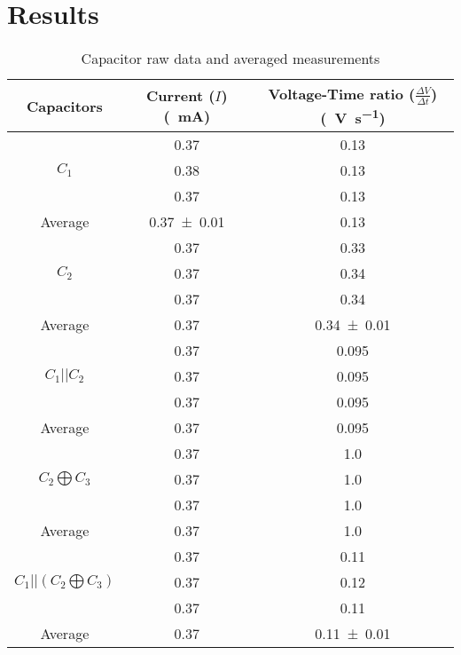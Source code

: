 \documentclass[a4paper]{scrartcl}
\begin{document}
\section{Results}
\begin{table}
    \centering
    \begin{tabular}{c | c | c}
        Capacitors & Current (\(I\)) (\SI{}{\milli\ampere}) & Voltage-Time ratio (\(\frac{\Delta V}{\Delta t}\)) (\SI{}{\volt\per\second}) \\
        \hline

        & \SI{0.37}{} & \SI{0.13}{} \\
        \(C_1\) & \SI{0.38}{} & \SI{0.13}{} \\
        & \SI{0.37}{} & \SI{0.13}{} \\
        \hdashline
        Average & \SI{0.37 \pm 0.01}{} & \SI{0.13}{} \\
        \hline

        & \SI{0.37}{} & \SI{0.33}{} \\
        \(C_2\) & \SI{0.37}{} & \SI{0.34}{} \\
        & \SI{0.37}{} & \SI{0.34}{} \\
        \hdashline
        Average & \SI{0.37}{} & \SI{0.34 \pm 0.01}{} \\
        \hline

        & \SI{0.37}{} & \SI{0.095}{} \\
        \(C_1 || C_2\) & \SI{0.37}{} & \SI{0.095}{} \\
        & \SI{0.37}{} & \SI{0.095}{} \\
        \hdashline
        Average & \SI{0.37}{} & \SI{0.095}{} \\
        \hline

        & \SI{0.37}{} & \SI{1.0}{} \\
        \(C_2 \bigoplus C_3\) & \SI{0.37}{} & \SI{1.0}{} \\
        & \SI{0.37}{} & \SI{1.0}{} \\
        \hdashline
        Average & \SI{0.37}{} & \SI{1.0}{} \\
        \hline

        & \SI{0.37}{} & \SI{0.11}{} \\
        \(C_1 || (C_2 \bigoplus C_3)\) & \SI{0.37}{} & \SI{0.12}{} \\
        & \SI{0.37}{} & \SI{0.11}{} \\
        \hdashline
        Average & \SI{0.37}{} & \SI{0.11 \pm 0.01}{} \\
        \hline
    \end{tabular}
    \caption{Capacitor raw data and averaged measurements}
    \label{tab:capacitor_data}
\end{table}
\end{document}
